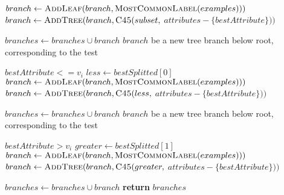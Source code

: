 \begin{algorithm}[H]
\begin{algorithmic}[1]
              \State $branch \gets \textsc{AddLeaf}(branch, \textsc{MostCommonLabel}(examples)))$
          \Else
              \State $branch \gets \textsc{AddTree}(branch, \textsc{C45}(subset,$ $attributes - \{bestAttribute\}))$\par\hfill
          \EndIf
          \State $branches \gets branches \cup branch$
      \EndFor
    \Else
       $branch$ {\small be a new tree branch below root, corresponding to the test}  \par\hfill $bestAttribute <= v_i$
      \State $less \gets bestSplitted[0]$
          \State $branch \gets \textsc{AddLeaf}(branch, \textsc{MostCommonLabel}(examples)))$
      \Else
          \State $branch \gets \textsc{AddTree}(branch, \textsc{C45}(less,$ $attributes - \{bestAttribute\}))$\par\hfill
      \EndIf
      \State $branches \gets branches \cup branch$
       $branch$ {\small be a new tree branch below root, corresponding to the test}  \par\hfill $bestAttribute > v_i$
      \State $greater \gets bestSplitted[1]$
          \State $branch \gets \textsc{AddLeaf}(branch, \textsc{MostCommonLabel}(examples)))$
      \Else
          \State $branch \gets \textsc{AddTree}(branch, \textsc{C45}(greater,$ $attributes - \{bestAttribute\}))$\par\hfill
      \EndIf
      \State $branches \gets branches \cup branch$
    \EndIf
    \State \textbf{return} $branches$
\EndProcedure
\end{algorithmic}
\end{algorithm}

